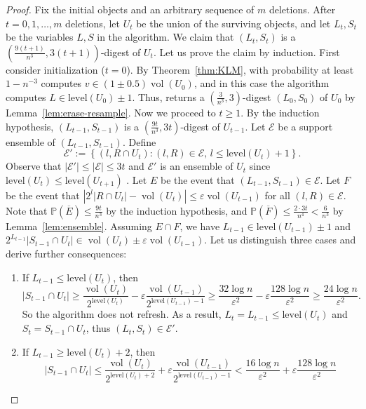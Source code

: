 \documentclass[11pt]{article}
\def\vol{\operatorname{vol}}		%
\def\set#1{\left\{ #1 \right\}}
\newcommand{\level}{\mathrm{level}}
\newcommand{\eps}{\varepsilon}
\renewcommand{\Pr}{\mathbb{P}}
\newcommand{\class}[1]{\mathcal{#1}}
\begin{document}
%
\begin{proof}
    Fix the initial objects and an arbitrary sequence of $m$ deletions. After $t = 0, 1, \dots, m$ deletions, let $U_t$ be the union of the surviving objects, and let $L_t,S_t$ be the variables $L,S$ in the algorithm. We claim that $(L_t,S_t)$ is a $(\frac{9(t+1)}{n^3}, 3(t+1))$-digest of $U_t$.
%
    Let us prove the claim by induction. First consider initialization ($t = 0$). By Theorem~\ref{thm:KLM}, with probability at least $1 - n^{-3}$ \KLM computes $v \in (1 \pm 0.5) \vol(U_0)$, and in this case the algorithm computes $L \in \level(U_0) \pm 1$. Thus, \resample returns a $(\frac{3}{n^3},3)$-digest $(L_0,S_0)$ of $U_0$ by Lemma~\ref{lem:erase-resample}.
%
    Now we proceed to $t \geq 1$. By the induction hypothesis, $(L_{t-1},S_{t-1})$ is a $(\frac{9t}{n^3}, 3t)$-digest of $U_{t-1}$. Let $\class{E}$ be a support ensemble of $(L_{t-1}, S_{t-1})$. Define
    \[
        \class{E}' := \set{(l,R \cap U_t) : (l,R) \in \class{E},\, l \leq \level(U_t)+1 }.
    \]
    Observe that $|\class{E}'| \leq |\class{E}| \leq 3t$ and $\class{E}'$ is an ensemble of $U_t$ since $\level(U_t) \leq \level(U_{t+1})$ .
%
    Let $E$ be the event that $(L_{t-1}, S_{t-1}) \in \class{E}$. Let $F$ be the event that $\left| 2^l |R \cap U_t| - \vol(U_t) \right| \leq \eps \vol(U_{t-1})$ for all $(l,R) \in \class{E}$. Note that $\Pr(\overline{E}) \leq \frac{9t}{n^3}$ by the induction hypothesis, and $\Pr(\overline{F}) \leq \frac{2 \cdot 3t}{n^4} < \frac{6}{n^3}$ by Lemma~\ref{lem:ensemble}.
%
    Assuming $E \cap F$, we have $L_{t-1} \in \level(U_{t-1}) \pm 1$ and $2^{L_{t-1}} |S_{t-1} \cap U_t| \in \vol(U_t)\pm\eps \vol(U_{t-1})$. Let us distinguish three cases and derive further consequences:
    \begin{enumerate}[label={(\arabic*)}]
        \item If $L_{t-1} \leq \level(U_t)$, then
        \[
            |S_{t-1} \cap U_t|
            \geq \frac{\vol(U_t)}{2^{\level(U_t)}} - \eps \frac{\vol(U_{t-1})}{2^{\level(U_{t-1})-1}}
            \geq \frac{32 \log n}{\eps^2} - \eps \frac{128 \log n}{\eps^2}
            \geq \frac{24 \log n}{\eps^2}.
        \]
        So the algorithm does not refresh. As a result, $L_t = L_{t-1} \leq \level(U_t)$ and $S_t = S_{t-1} \cap U_t$, thus $(L_t, S_t) \in \class{E}'$.
%
        \item If $L_{t-1} \geq \level(U_t) + 2$, then
        \[
            |S_{t-1} \cap U_t|
            \leq \frac{\vol(U_t)}{2^{\level(U_t)+2}} + \eps \frac{\vol(U_{t-1})}{2^{\level(U_{t-1})-1}}
            < \frac{16 \log n}{\eps^2} + \eps \frac{128 \log n}{\eps^2}
\]
\end{enumerate}
\end{proof}
\end{document}
